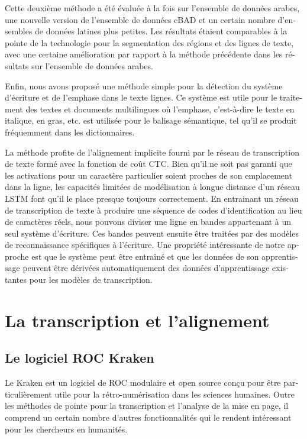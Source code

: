 \begin{french}
Cette deuxième méthode a été évaluée à la fois sur l'ensemble de données
arabes, une nouvelle version de l'ensemble de données cBAD et un certain nombre
d'ensembles de données latines plus petites. Les résultats étaient comparables
à la pointe de la technologie pour la segmentation des régions et des lignes de
texte, avec une certaine amélioration par rapport à la méthode précédente dans
les résultats sur l'ensemble de données arabes.

Enfin, nous avons proposé une méthode simple pour la détection du système
d'écriture et de I'emphase dans le texte lignes. Ce système est utile pour le
traitement des textes et documents multilingues où l'emphase, c'est-à-dire le
texte en italique, en gras, etc. est utilisée pour le balisage sémantique, tel
qu'il se produit fréquemment dans les dictionnaires.

La méthode profite de l'alignement implicite fourni par le réseau de
transcription de texte formé avec la fonction de coût CTC.  Bien qu'il ne soit
pas garanti que les activations pour un caractère particulier soient proches de
son emplacement dans la ligne, les capacités limitées de modélisation à longue
distance d'un réseau LSTM font qu'il le place presque toujours correctement.
En entrainant un réseau de transcription de texte à produire une séquence de
codes d'identification au lieu de caractères réels, nous pouvons diviser une
ligne en bandes appartenant à un seul système d'écriture. Ces bandes peuvent
ensuite être traitées par des modèles de reconnaissance spécifiques à
l'écriture. Une propriété intéressante de notre approche est que le système
peut être entraîné et que les données de son apprentissage peuvent être
dérivées automatiquement des données d'apprentissage existantes pour les
modèles de transcription.

\section{La transcription et l'alignement}

\subsection{Le logiciel ROC Kraken}

Le Kraken est un logiciel de ROC modulaire et open source conçu pour être
particulièrement utile pour la rétro-numérisation dans les sciences humaines.
Outre les méthodes de pointe pour la transcription et l'analyse de la mise en
page, il comprend un certain nombre d'autres fonctionnalités qui le rendent
intéressant pour les chercheurs en humanités.


\end{french}

